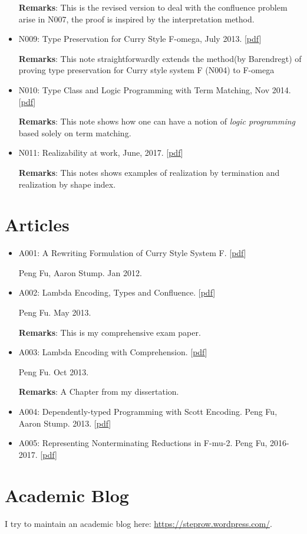 \documentclass[10pt]{article}
\begin{document}
\begin{itemize}
\noindent \textbf{Remarks}: This is the revised version to deal with the confluence problem arise in N007, the proof is inspired by the interpretation method. 

\item N009: Type Preservation for Curry Style F-omega, July 2013. [\href{../../document/notes/fomega-presv.pdf}{pdf}]

\noindent \textbf{Remarks}: This note straightforwardly extends the method(by Barendregt) of proving type preservation for Curry style system F (N004) to F-omega

\item N010: Type Class and Logic Programming with Term Matching, Nov 2014. [\href{../../document/notes/tm.pdf}{pdf}]

\noindent \textbf{Remarks}: This note shows how one can have a notion of \textit{logic programming} based solely on term matching. 

\item N011: Realizability at work,  June, 2017. [\href{../../document/notes/realization.pdf}{pdf}]

  \noindent \textbf{Remarks}: This notes shows examples of realization by termination and realization by shape index. 


  
\end{itemize}

\section*{Articles}

\begin{itemize}

\item A001: A Rewriting Formulation of Curry Style System F. [\href{../../document/notes/rewrite-f.pdf}{pdf}]

\noindent Peng Fu, Aaron Stump. Jan 2012.

\item A002: Lambda Encoding, Types and Confluence. [\href{../../document/notes/comp-exam.pdf}{pdf}]

\noindent Peng Fu. May 2013.

\noindent \textbf{Remarks}: This is my comprehensive exam paper. 

\item A003: Lambda Encoding with Comprehension. [\href{../../document/notes/comprehension.pdf}{pdf}]

\noindent Peng Fu. Oct 2013.

\noindent \textbf{Remarks}: A Chapter from my dissertation.


\item A004: Dependently-typed Programming with Scott Encoding. Peng Fu, Aaron Stump. 2013. [\href{../../document/papers/scott-dep.pdf}{pdf}]
 
\item A005: Representing Nonterminating Reductions in F-mu-2. Peng Fu, 2016-2017. [\href{../../document/papers/nonterm.pdf}{pdf}]

\end{itemize}
\section*{Academic Blog}
I try to maintain an academic blog here: \url{https://steprow.wordpress.com/}. 
\end{document}
